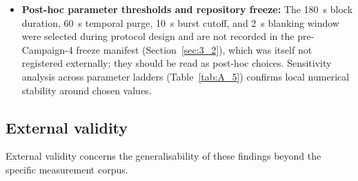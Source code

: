 \begin{itemize}
    \item \textbf{Post-hoc parameter thresholds and repository freeze:} The 180~s block duration, 60~s temporal purge, 10~s burst cutoff, and 2~s blanking window were selected during protocol design and are not recorded in the pre-Campaign-4 freeze manifest (Section~\ref{sec:3_2}), which was itself not registered externally; they should be read as post-hoc choices. Sensitivity analysis across parameter ladders (Table~\ref{tab:A_5}) confirms local numerical stability around chosen values.
\end{itemize}

\subsection{External validity}
External validity concerns the generalisability of these findings beyond the specific measurement corpus.
